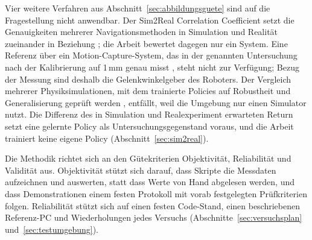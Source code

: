 Vier weitere Verfahren aus Abschnitt~\ref{sec:abbildungsguete} sind auf die Fragestellung nicht anwendbar.
Der Sim2Real Correlation Coefficient setzt die Genauigkeiten mehrerer Navigationsmethoden in Simulation und Realität zueinander in Beziehung \cite{Kadian2020}; die Arbeit bewertet dagegen nur ein System.
Eine Referenz über ein Motion-Capture-System, das in der genannten Untersuchung nach der Kalibrierung auf 1\,mm genau misst \cite{Collins2019}, steht nicht zur Verfügung; Bezug der Messung sind deshalb die Gelenkwinkelgeber des Roboters.
Der Vergleich mehrerer Physiksimulationen, mit dem trainierte Policies auf Robustheit und Generalisierung geprüft werden \cite{Gu2024}, entfällt, weil die Umgebung nur einen Simulator nutzt.
Die Differenz des in Simulation und Realexperiment erwarteten Return \cite{Tan2018} setzt eine gelernte Policy als Untersuchungsgegenstand voraus, und die Arbeit trainiert keine eigene Policy (Abschnitt~\ref{sec:sim2real}).

Die Methodik richtet sich an den Gütekriterien Objektivität, Reliabilität und Validität aus.
Objektivität stützt sich darauf, dass Skripte die Messdaten aufzeichnen und auswerten, statt dass Werte von Hand abgelesen werden, und dass Demonstrationen einem festen Protokoll mit vorab festgelegten Prüfkriterien folgen.
Reliabilität stützt sich auf einen festen Code-Stand, einen beschriebenen Referenz-PC und Wiederholungen jedes Versuchs (Abschnitte~\ref{sec:versuchsplan} und~\ref{sec:testumgebung}).

